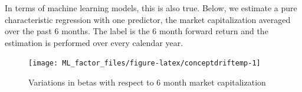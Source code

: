 \documentclass[]{krantz}
\makeatletter
\newenvironment{Shaded}{\begin{snugshade}}{\end{snugshade}}
\newcommand{\CommentTok}[1]{\textcolor[rgb]{0.37,0.37,0.37}{\textit{#1}}}
\newcommand{\DataTypeTok}[1]{\textcolor[rgb]{0.27,0.27,0.27}{#1}}
\newcommand{\KeywordTok}[1]{\textcolor[rgb]{0.27,0.27,0.27}{\textbf{#1}}}
\newcommand{\NormalTok}[1]{#1}
\newcommand{\OperatorTok}[1]{\textcolor[rgb]{0.43,0.43,0.43}{\textbf{#1}}}
\newcommand{\StringTok}[1]{\textcolor[rgb]{0.5,0.5,0.5}{#1}}
\newenvironment{kframe}{%
\medskip{}
\setlength{\fboxsep}{.8em}
 \def\at@end@of@kframe{}%
 \ifinner\ifhmode%
  \def\at@end@of@kframe{\end{minipage}}%
  \begin{minipage}{\columnwidth}%
 \fi\fi%
 \def\FrameCommand##1{\hskip\@totalleftmargin \hskip-\fboxsep
 \colorbox{shadecolor}{##1}\hskip-\fboxsep
     \hskip-\linewidth \hskip-\@totalleftmargin \hskip\columnwidth}%
 \MakeFramed {\advance\hsize-\width
   \@totalleftmargin\z@ \linewidth\hsize
   \@setminipage}}%
 {\par\unskip\endMakeFramed%
 \at@end@of@kframe}
\renewenvironment{Shaded}{\begin{kframe}}{\end{kframe}}
\theoremstyle{definition}
\theoremstyle{definition}
\theoremstyle{definition}
\theoremstyle{remark}
\makeatother
\begin{document}
In terms of machine learning models, this is also true. Below, we
estimate a pure characteristic regression with one predictor, the market
capitalization averaged over the past 6 months. The label is the 6 month
forward return and the estimation is performed over every calendar year.

\footnotesize

\begin{Shaded}
\end{Shaded}

\begin{figure}[H]

{\centering \texttt{[image: ML\_factor\_files/figure-latex/conceptdriftemp-1]} 

}

\caption{Variations in betas with respect to 6 month market capitalization}\label{fig:conceptdriftemp}
\end{figure}
\end{document}
